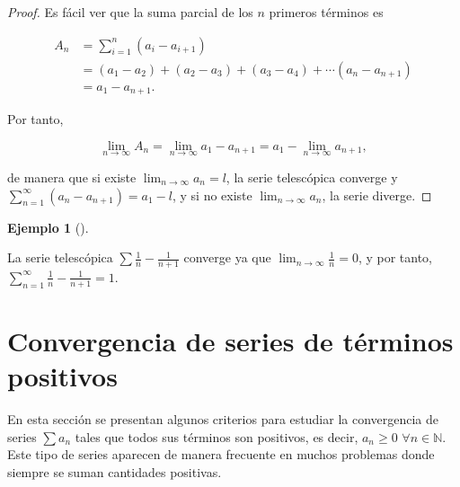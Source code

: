 \documentclass[
  a4paper,
]{scrreport}
\theoremstyle{definition}
\newtheorem{example}{Ejemplo}[chapter]
\theoremstyle{plain}
\theoremstyle{definition}
\theoremstyle{definition}
\theoremstyle{plain}
\theoremstyle{plain}
\theoremstyle{remark}
\begin{document}
\begin{tcolorbox}[enhanced jigsaw, leftrule=.75mm, colbacktitle=quarto-callout-note-color!10!white, toprule=.15mm, opacityback=0, opacitybacktitle=0.6, toptitle=1mm, breakable, bottomtitle=1mm, colframe=quarto-callout-note-color-frame, rightrule=.15mm, titlerule=0mm, title=\textcolor{quarto-callout-note-color}{\faInfo}\hspace{0.5em}{Demostración}, arc=.35mm, left=2mm, bottomrule=.15mm, colback=white, coltitle=black]

\begin{proof}
Es fácil ver que la suma parcial de los \(n\) primeros términos es

\begin{align*}
A_n &= \sum_{i=1}^n (a_i-a_{i+1})\\ 
& = (a_1-a_2)+(a_2-a_3)+(a_3-a_4)+\cdots (a_n-a_{n+1})\\ 
& = a_1-a_{n+1}.
\end{align*}

Por tanto,

\[
\lim_{n\to\infty} A_n = \lim_{n\to\infty} a_1-a_{n+1} = a_1 - \lim_{n\to\infty} a_{n+1},
\]

de manera que si existe \(\lim_{n\to\infty} a_n=l\), la serie
telescópica converge y \(\sum_{n=1}^\infty (a_n-a_{n+1}) = a_1-l\), y si
no existe \(\lim_{n\to\infty} a_n\), la serie diverge.
\end{proof}

\end{tcolorbox}

\begin{example}[]\protect\hypertarget{exm-convergencia-series-telescopicas}{}\label{exm-convergencia-series-telescopicas}

La serie telescópica \(\sum \frac{1}{n}-\frac{1}{n+1}\) converge ya que
\(\lim_{n\to\infty}\frac{1}{n} = 0\), y por tanto,
\(\sum_{n=1}^\infty \frac{1}{n}-\frac{1}{n+1} = 1\).

\end{example}

\section{Convergencia de series de términos
positivos}\label{convergencia-de-series-de-tuxe9rminos-positivos}

En esta sección se presentan algunos criterios para estudiar la
convergencia de series \(\sum a_n\) tales que todos sus términos son
positivos, es decir, \(a_n\geq 0\) \(\forall n\in\mathbb{N}\). Este tipo
de series aparecen de manera frecuente en muchos problemas donde siempre
se suman cantidades positivas.
\end{document}
